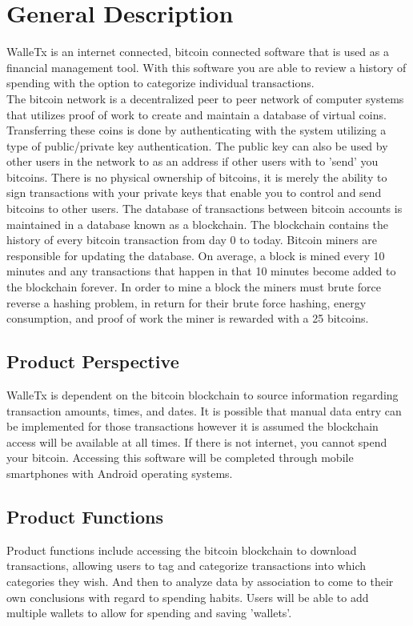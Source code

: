 \section{General Description}
  WalleTx is an internet connected, bitcoin connected software that is used as a financial management tool. With this software you are able to review a history of spending with the option to categorize individual transactions.\\

  The bitcoin network is a decentralized peer to peer network of computer systems that utilizes proof of work to create and maintain a database of virtual coins. Transferring these coins is done by authenticating with the system utilizing a type of public/private key authentication. The public key can also be used by other users in the network to as an address if other users with to 'send' you bitcoins. There is no physical ownership of bitcoins, it is merely the ability to sign transactions with your private keys that enable you to control and send bitcoins to other users. The database of transactions between bitcoin accounts is maintained in a database known as a blockchain. The blockchain contains the history of every bitcoin transaction from day 0 to today. Bitcoin miners are responsible for updating the database. On average, a block is mined every 10 minutes and any transactions that happen in that 10 minutes become added to the blockchain forever. In order to mine a block the miners must brute force reverse a hashing problem, in return for their brute force hashing, energy consumption, and proof of work the miner is rewarded with a 25 bitcoins.
  \subsection{Product Perspective}
  WalleTx is dependent on the bitcoin blockchain to source information regarding transaction amounts, times, and dates. It is possible that manual data entry can be implemented for those transactions however it is assumed the blockchain access will be available at all times. If there is not internet, you cannot spend your bitcoin. Accessing this software will be completed through mobile smartphones with Android operating systems.
  \subsection{Product Functions}
  Product functions include accessing the bitcoin blockchain to download transactions, allowing users to tag and categorize transactions into which categories they wish. And then to analyze data by association to come to their own conclusions with regard to spending habits. Users will be able to add multiple wallets to allow for spending and saving 'wallets'. 
